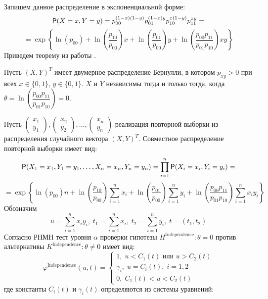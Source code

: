 Запишем данное распределение в экспоненциальной форме:
$$
\mathsf{P}(X=x,Y=y)=p_{00}^{(1-x)(1-y)}p_{01}^{(1-x)y}
p_{10}^{x(1-y)}p_{11}^{xy}=
$$
$$=\exp \left\{\ln(p_{00}) + 
     \ln \left(\dfrac{p_{10}}{p_{00}}\right) x
    +  \ln \left(\dfrac{p_{01}}{p_{00}}\right) y +
     \ln\left(\dfrac{p_{00}p_{11}}{p_{01}p_{10}}\right) xy
 \right\}
$$
Приведем теорему из работы \cite{Dai2013}.
\begin{theorem}
    Пусть $(X,Y)^T$ имеет двумерное распределение Бернулли,
    в котором $p_{xy} > 0$ при всех
    $x \in \{0,1\}$, $y\in \{0,1\}$. $X$ и $Y$ независимы тогда и только тогда, когда
$\theta=\ln\left(\dfrac{p_{00}p_{11}}{p_{01}p_{10}}\right)=0$.
\end{theorem}
Пусть
    $
        \begin{pmatrix}
            x_1 \\
            y_1 
        \end{pmatrix},
        \begin{pmatrix}
            x_2 \\
            y_2
        \end{pmatrix}, \ldots,
        \begin{pmatrix}
            x_n \\
            y_n
        \end{pmatrix}
    $
    реализация повторной выборки из распределения случайного вектора $(X,Y)^T$.
    Совместное распределение повторной выборки имеет вид:
$$
    \mathsf{P}(X_1=x_1,Y_1=y_1,\ldots,X_n=x_n,Y_n=y_n)
    =\prod_{i=1}^n \mathsf{P}(X_i=x_i,Y_i=y_i) =
    $$
    $$
    =\exp \left\{ \ln(p_{00})n + 
        \ln \left(\dfrac{p_{10}}{p_{00}}\right) \sum_{i=1}^n x_i 
        +\ln \left(\dfrac{p_{01}}{p_{00}}\right) \sum_{i=1}^{n} y_i   +
        \ln\left(\dfrac{p_{00}p_{11}}{p_{01}p_{10}}\right) \sum_{i=1}^n x_i y_i 
     \right\}
    $$
    Обозначим 
    $$
    u = \sum_{i=1}^n x_i y_i,\;
    t_1 = \sum_{i=1}^n x_i,\;
    t_2 = \sum_{i=1}^n y_i, \; t=(t_1,t_2)$$
    Согласно \cite{Lehmann1986} РНМН тест уровня $\alpha$ проверки гипотезы $H^{\text{Independence}}: \theta = 0$ против альтернативы $K^{\text{Independence}}: \theta \neq 0$ 
    имеет вид:
    $$
    \varphi^{\text{Independence}}(u,t)=\begin{cases}
        1, \; u<C_1(t) \text{ или } u>C_2(t)\\
        \gamma_i, \; u=C_i(t), \; i=1,2\\
        0, \; C_1(t)<u<C_2(t)
    \end{cases}
    $$
    где константы $C_i(t)$ и $\gamma_i(t)$ определяются из системы уравнений:

